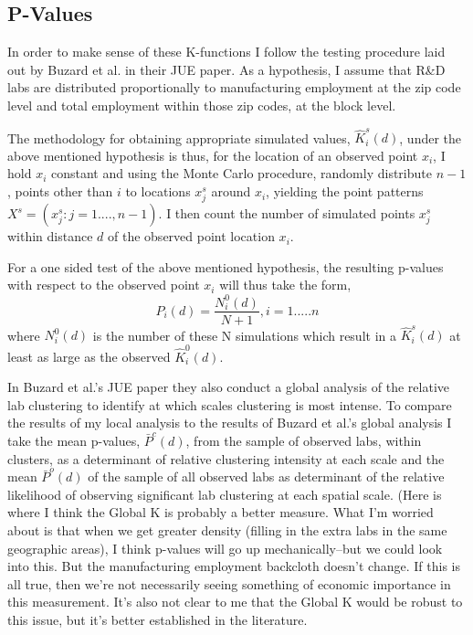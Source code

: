 \documentclass[12pt,letterpaper]{article}
\begin{document}
\subsection{P-Values}
In order to make sense of these K-functions I follow the testing procedure laid out by Buzard et al. in their JUE paper. As a hypothesis, I assume that R\&D labs are distributed proportionally to manufacturing employment at the zip code level and total employment within those zip codes, at the block level.
\par 
The methodology for obtaining appropriate simulated values, \(\hat{K}^{s}_{i}(d)\), under the above mentioned hypothesis is thus, for the location of an observed point \(x_i\), I hold \(x_i\) constant and using the Monte Carlo procedure, randomly distribute \(n-1\), points other than \(i\) to locations \(x_{j}^{s} \) around \(x_i\), yielding the point patterns \(X^{s} = (x^{s}_{j} : j = 1....,n-1)\). I then count the number of simulated points \(x^{s}_{j}\) within distance \(d\) of the observed point location \(x_i\).
\par 
For a one sided test of the above mentioned hypothesis, the resulting p-values with respect to the observed point \(x_i\) will thus take the form, 
\begin{equation}\label{eq:2}
    P_{i}(d) = \frac{N_{i}^{0}(d)}{N + 1}, i = 1.....n
\end{equation}
where \(N_{i}^{0}(d)\) is the number of these N simulations which result in a \(\hat{K}^{s}_{i}(d)\) at least as large as the observed \(\hat{K}_{i}^{0}(d)\).  
\par 
In Buzard et al.'s JUE paper they also conduct a global analysis of the relative lab clustering to identify at which scales clustering is most intense. To compare the results of my local analysis to the results of Buzard et al.'s global analysis I take the mean p-values, \(\bar{P}^c(d)\), from the sample of observed labs, within clusters, as a determinant of relative clustering intensity at each scale and the mean \(\bar{P}^o(d)\) of the sample of all observed labs as determinant of the relative likelihood of observing significant lab clustering at each spatial scale. {\color{blue}(Here is where I think the Global K is probably a better measure. What I'm worried about is that when we get greater density (filling in the extra labs in the same geographic areas), I think p-values will go up mechanically--but we could look into this. But the manufacturing employment backcloth doesn't change. If this is all true, then we're not necessarily seeing something of economic importance in this measurement. It's also not clear to me that the Global K would be robust to this issue, but it's better established in the literature.}
\end{document}

